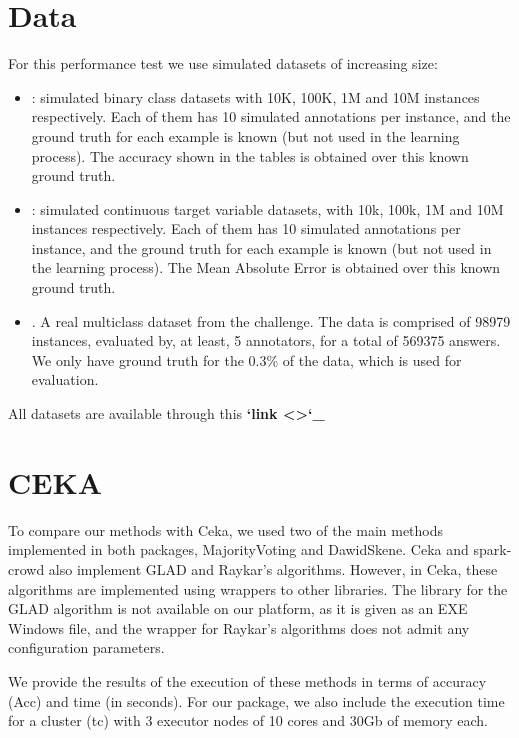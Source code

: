 \documentclass[letterpaper,10pt,english]{sphinxmanual}
\begin{document}
\section{Data}
\label{\detokenize{package/other:data}}
For this performance test we use simulated datasets of increasing size:
\begin{itemize}
\item {} 
: simulated binary class datasets with 10K, 100K, 1M and 10M instances respectively. Each of them
has 10 simulated annotations per instance, and the ground truth for each example is known (but not used in the
learning process). The accuracy shown in the tables is obtained over this known ground truth.

\item {} 
: simulated continuous target variable datasets, with 10k, 100k, 1M and 10M instances respectively. Each of them
has 10 simulated annotations per instance, and the ground truth for each example is known (but not used in the
learning process). The Mean Absolute Error is obtained over this known ground truth.

\item {} 
. A real multiclass dataset from the  challenge. The data is comprised of 98979 instances,
evaluated by, at least, 5 annotators, for a total of 569375 answers. We only have ground truth for the 0.3\% of the data,
which is used for evaluation.

\end{itemize}

All datasets are available through this {\color{red}\bfseries{}{}`link \textless{}\textgreater{}{}`\_}


\section{CEKA}
\label{\detokenize{package/other:id1}}
To compare our methods with Ceka, we used two of the main methods implemented in both packages, MajorityVoting and DawidSkene. Ceka and
spark-crowd also implement GLAD and Raykar’s algorithms. However, in Ceka, these algorithms are implemented using wrappers to other libraries.
The library for the GLAD algorithm is not available on our platform, as it is given as an EXE Windows file, and the wrapper for Raykar’s algorithms
does not admit any configuration parameters.

We provide the results of the execution of these methods in terms of accuracy (Acc) and time (in seconds). For our package, we also include
the execution time for a cluster (tc) with 3 executor nodes of 10 cores and 30Gb of memory each.
\end{document}
